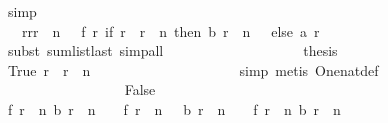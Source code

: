 \begin{isabellebody}
\ simp\isanewline
\ \ \ \ \ \ \ \ \ \ \ \ \ \ \ \ \isamarkupfalse%
\isanewline
\ \ \ \ \ \ \ \ \ \ \ \ \ \ \ \ \isamarkupfalse%
\ \isamarkupfalse%
\ {\isachardoublequoteopen}{\isachardot}{\isachardot}{\isachardot}\ {\isacharequal}\ {\isacharparenleft}{\isasymSum}r{\isacharprime}{\isasymleftarrow}{\isacharbrackleft}r{}{\isachardot}{\isachardot}{\isacharless}r{}\ {\isacharplus}\ n\ {\isacharplus}\ {}{\isacharbrackright}{\isachardot}\ f\ r{\isacharprime}\ {\isacharparenleft}if\ r{\isacharprime}\ {\isacharequal}\ r{}\ {\isacharplus}\ n\ then\ b\ {\isacharparenleft}r{}\ {\isacharplus}\ n\ {\isacharminus}\ {}{\isacharparenright}\ else\ {\isacharparenleft}a\ r{\isacharprime}{\isacharparenright}{\isacharparenright}{\isacharparenright}{\isachardoublequoteclose}\isanewline
\ \ \ \ \ \ \ \ \ \ \ \ \ \ \ \ \ \ \isamarkupfalse%
\ {\isacharparenleft}subst\ sum{\isacharunderscore}list{\isacharunderscore}last{\isacharcomma}\ simp{\isacharunderscore}all{\isacharparenright}\isanewline
\ \ \ \ \ \ \ \ \ \ \ \ \ \ \ \ \isamarkupfalse%
\ \isamarkupfalse%
\ {\isacharquery}thesis\isanewline
\ \ \ \ \ \ \ \ \ \ \ \ \ \ \ \ \ \ \isamarkupfalse%
\ True\ {\isacharbackquoteopen}r\ {\isacharequal}\ r{}\ {\isacharplus}\ n{\isacharbackquoteclose}\ \isanewline
\ \ \ \ \ \ \ \ \ \ \ \ \ \ \ \ \ \ \isamarkupfalse%
\ simp\ {\isacharparenleft}metis\ One{\isacharunderscore}nat{\isacharunderscore}def{\isacharparenright}\isanewline
\ \ \ \ \ \ \ \ \ \ \ \ \ \ \isamarkupfalse%
\isanewline
\ \ \ \ \ \ \ \ \ \ \ \ \ \ \ \ \isamarkupfalse%
\ False\isanewline
\ \ \ \ \ \ \ \ \ \ \ \ \ \ \ \ \isamarkupfalse%
\ {\isachardoublequoteopen}f\ {\isacharparenleft}r{}\ {\isacharplus}\ n{\isacharparenright}\ {\isacharparenleft}b\ {\isacharparenleft}r{}\ {\isacharplus}\ n\ {\isacharminus}\ {}{\isacharparenright}{\isacharparenright}\ {\isacharequal}\ f\ {\isacharparenleft}r{}\ {\isacharplus}\ n\ {\isacharminus}\ {}{\isacharparenright}\ {\isacharparenleft}b\ {\isacharparenleft}r{}\ {\isacharplus}\ n\ {\isacharminus}\ {}{\isacharparenright}{\isacharparenright}\ {\isacharplus}\ f\ {\isacharparenleft}r{}\ {\isacharplus}\ n{\isacharparenright}\ {\isacharparenleft}b\ {\isacharparenleft}r{}\ {\isacharplus}\ n\ {\isacharminus}\ {}{\isacharparenright}\ {\isacharplus}\ {}{\isacharparenright}{\isachardoublequoteclose}\isanewline

\end{isabellebody}
